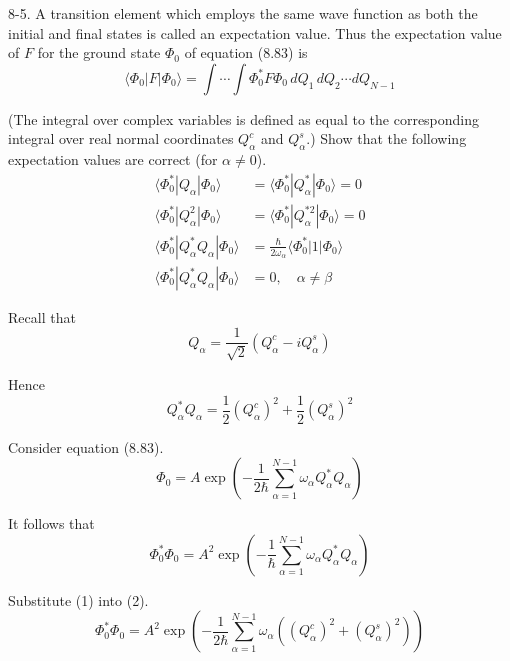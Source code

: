 \documentclass[12pt]{article}
\begin{document}
8-5.
A transition element which employs the same wave
function as both the initial and final states is called an expectation value.
Thus the expectation value of $F$ for the ground state $\Phi_0$ of
equation (8.83) is
\begin{equation*}
\langle\Phi_0|F|\Phi_0\rangle
=\int\cdots\int
\Phi_0^*F\Phi_0\,dQ_1\,dQ_2\cdots dQ_{N-1}
\tag{8.84}
\end{equation*}

(The integral over complex variables is defined as equal to the
corresponding integral over real normal coordinates $Q_\alpha^c$
and $Q_\alpha^s$.)
Show that the following expectation values are correct (for $\alpha\ne0$).
\begin{equation*}
\begin{aligned}
\langle\Phi_0^*|Q_\alpha|\Phi_0\rangle
&=\langle\Phi_0^*|Q_\alpha^*|\Phi_0\rangle=0
\\
\langle\Phi_0^*|Q_\alpha^2|\Phi_0\rangle
&=\langle\Phi_0^*|Q_\alpha^{*2}|\Phi_0\rangle=0
\\
\langle\Phi_0^*|Q_\alpha^*Q_\alpha|\Phi_0\rangle
&=\frac{\hbar}{2\omega_\alpha}\langle\Phi_0^*|1|\Phi_0\rangle
\\
\langle\Phi_0^*|Q_\alpha^*Q_\alpha|\Phi_0\rangle&=0,\quad\alpha\ne\beta
\end{aligned}
\tag{8.85}
\end{equation*}

Recall that
\begin{equation*}
Q_\alpha=\frac{1}{\sqrt2}(Q_\alpha^c-iQ_\alpha^s)
\end{equation*}

Hence
\begin{equation*}
Q_\alpha^*Q_\alpha=\frac{1}{2}(Q_\alpha^c)^2+\frac{1}{2}(Q_\alpha^s)^2
\tag{1}
\end{equation*}

Consider equation (8.83).
\begin{equation*}
\Phi_0=A\exp\left(
-\frac{1}{2\hbar}
\sum_{\alpha=1}^{N-1}
\omega_\alpha Q_\alpha^*Q_\alpha
\right)
\tag{8.83}
\end{equation*}

It follows that
\begin{equation*}
\Phi_0^*\Phi_0
=A^2
\exp\left(
-\frac{1}{\hbar}
\sum_{\alpha=1}^{N-1}
\omega_\alpha Q_\alpha^*Q_\alpha
\right)
\tag{2}
\end{equation*}

Substitute (1) into (2).
\begin{equation*}
\Phi_0^*\Phi_0
=A^2\exp\left(
-\frac{1}{2\hbar}
\sum_{\alpha=1}^{N-1}
\omega_\alpha\left((Q_\alpha^c)^2+(Q_\alpha^s)^2\right)
\right)
\end{equation*}
\end{document}
